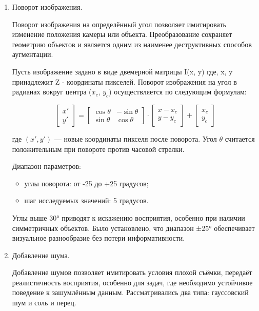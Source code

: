 \begin{enumerate}
	\item Поворот изображения.

Поворот изображения на определённый угол позволяет имитировать изменение положения камеры или объекта. Преобразование сохраняет геометрию объектов и является одним из наименее деструктивных способов аугментации.

Пусть изображение задано в виде двемерной матрицы I(x, y) где, x, y принадлежит Z - координаты пикселей. Поворот изображения на угол в радианах вокруг центра ($x_c$, $y_c$) осуществляется по следующим формулам:


\[
\begin{bmatrix}
	x' \\
	y'
\end{bmatrix}
=
\begin{bmatrix}
	\cos\theta & -\sin\theta \\
	\sin\theta & \cos\theta
\end{bmatrix}
\cdot
\begin{bmatrix}
	x - x_c \\
	y - y_c
\end{bmatrix}
+
\begin{bmatrix}
	x_c \\
	y_c
\end{bmatrix}
\]

где $(x', y')$ — новые координаты пикселя после поворота. Угол $\theta$ считается положительным при повороте против часовой стрелки.

Диапазон параметров:
\begin{itemize}
	\item углы поворота: от -25 до +25 градусов;
	\item шаг исследуемых значений: 5 градусов.
\end{itemize}

Углы выше 30° приводят к искажению восприятия, особенно при наличии симметричных объектов. Было установлено, что диапазон ±25° обеспечивает визуальное разнообразие без потери информативности.


	\item Добавление шума.
	
Добавление шумов позволяет имитировать условия плохой съёмки, передаёт реалистичность восприятия, особенно для задач, где необходимо устойчивое поведение к зашумлённым данным. Рассматривались два типа: гауссовский шум и соль и перец.


\end{enumerate}
